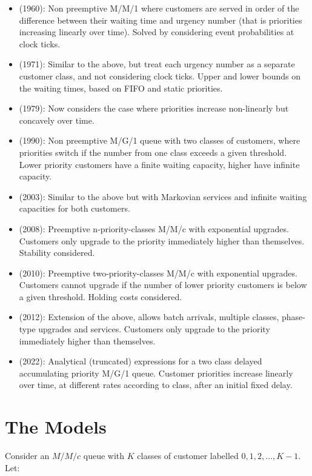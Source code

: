 \documentclass{article}
\begin{document}
\begin{itemize}
  \item \cite{jackson60} (1960): Non preemptive M/M/1 where customers
      are served in order of the difference between their waiting time
        and urgency number (that is priorities increasing linearly over
        time). Solved by considering event probabilities at clock ticks.
  \item \cite{holtzman71} (1971): Similar to the above, but treat each
      urgency number as a separate customer class, and not considering
        clock ticks. Upper and lower bounds on the waiting times, based
        on FIFO and static priorities.
  \item \cite{netterman79} (1979): Now considers the case where
      priorities increase non-linearly but concavely over time.
  \item \cite{fratini90} (1990): Non preemptive M/G/1 queue with two
      classes of customers, where priorities switch if the number from
        one class exceeds a given threshold. Lower priority customers
        have a finite waiting capacity, higher have infinite capacity.
  \item \cite{knessl03} (2003): Similar to the above but with Markovian
      services and infinite waiting capacities for both customers.
  \item \cite{xie08} (2008): Preemptive n-priority-classes M/M/c with
      exponential upgrades. Customers only upgrade to the priority
        immediately higher than themselves. Stability considered.
  \item \cite{down10} (2010): Preemptive two-priority-classes M/M/c with
      exponential upgrades. Customers cannot upgrade if the number of
        lower priority customers is below a given threshold. Holding
        costs considered.
  \item \cite{he12} (2012): Extension of the above, allows batch
      arrivals, multiple classes, phase-type upgrades and services.
        Customers only upgrade to the priority immediately higher than
        themselves.
  \item \cite{bilodeau22} (2022): Analytical (truncated) expressions for
      a two class delayed accumulating priority M/G/1 queue. Customer
        priorities increase linearly over time, at different rates
        according to class, after an initial fixed delay.
\end{itemize}



\section{The Models}\label{sec:model}
Consider an $M/M/c$ queue with $K$ classes of customer labelled
$0, 1, 2, \dots, K-1$.
Let:
\end{document}
